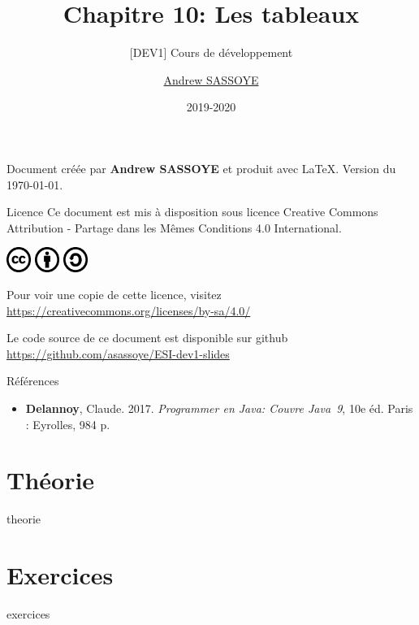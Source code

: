 \documentclass[utf8]{beamer}
\title{Chapitre 10: Les tableaux}
\subtitle{\tiny [DEV1] Cours de développement}
\author{\href{https://andrew.sassoye.be}{Andrew SASSOYE}}
\date{2019-2020}
\begin{document}
    \begin{frame}
        \titlepage
    \end{frame}

    \begin{frame}
        \center Document créée par \textbf{Andrew SASSOYE} et produit avec \LaTeX.
        \tiny Version du \today. \normalsize

        \begin{block}{Licence}
            Ce document est mis à disposition sous licence Creative Commons
            Attribution - Partage dans les Mêmes Conditions 4.0 International.

            \begin{center}
                \includegraphics[width=8mm]{./styles/images/cc}
                \includegraphics[width=8mm]{./styles/images/by}
                \includegraphics[width=8mm]{./styles/images/sa}
            \end{center}

            \center\tiny Pour voir une copie de cette licence, visitez
            \href{https://creativecommons.org/licenses/by-sa/4.0/}{https://creativecommons.org/licenses/by-sa/4.0/}
            \normalsize
        \end{block}

        \tiny Le code source de ce document est disponible sur github\\ \href{https://github.com/asassoye/ESI-dev1-slides}{https://github.com/asassoye/ESI-dev1-slides}

    \end{frame}

    \begin{frame}{Références}
        \begin{itemize}
            \item \textbf{Delannoy}, Claude. 2017. \textit{Programmer en Java: Couvre Java~9}, 10e éd. Paris : Eyrolles, 984 p.
        \end{itemize}
    \end{frame}

    \part{Théorie}
        {theorie}

    \part{Exercices}
        {exercices}
\end{document}
